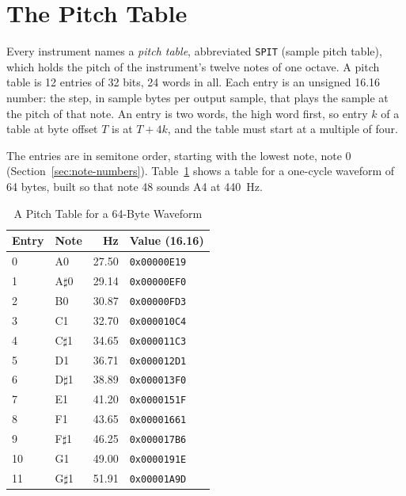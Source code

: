 \section{The Pitch Table}
\label{sec:pitch-table}

Every instrument names a \emph{pitch table}, abbreviated \texttt{SPIT} (sample pitch table), which holds the pitch of
the instrument's twelve notes of one octave. A pitch table is 12 entries of 32 bits, 24 words in all. Each entry is an
unsigned 16.16 number: the step, in sample bytes per output sample, that plays the sample at the pitch of that note. An
entry is two words, the high word first, so entry $k$ of a table at byte offset $T$ is at $T + 4k$, and the table must
start at a multiple of four.

The entries are in semitone order, starting with the lowest note, note 0 (Section~\ref{sec:note-numbers}).
Table~\ref{tab:pitch-table} shows a table for a one-cycle waveform of 64 bytes, built so that note 48 sounds A4 at
440~Hz.

\begin{table}[H]
	\centering
	\begin{tabular}{llrl}
		\toprule
		\textbf{Entry} & \textbf{Note} & \textbf{Hz} & \textbf{Value (16.16)} \\
		\midrule
		0              & A0            & 27.50       & \texttt{0x00000E19}    \\
		1              & A$\sharp$0    & 29.14       & \texttt{0x00000EF0}    \\
		2              & B0            & 30.87       & \texttt{0x00000FD3}    \\
		3              & C1            & 32.70       & \texttt{0x000010C4}    \\
		4              & C$\sharp$1    & 34.65       & \texttt{0x000011C3}    \\
		5              & D1            & 36.71       & \texttt{0x000012D1}    \\
		6              & D$\sharp$1    & 38.89       & \texttt{0x000013F0}    \\
		7              & E1            & 41.20       & \texttt{0x0000151F}    \\
		8              & F1            & 43.65       & \texttt{0x00001661}    \\
		9              & F$\sharp$1    & 46.25       & \texttt{0x000017B6}    \\
		10             & G1            & 49.00       & \texttt{0x0000191E}    \\
		11             & G$\sharp$1    & 51.91       & \texttt{0x00001A9D}    \\
		\bottomrule
	\end{tabular}
	\caption{A Pitch Table for a 64-Byte Waveform}
	\label{tab:pitch-table}
\end{table}

